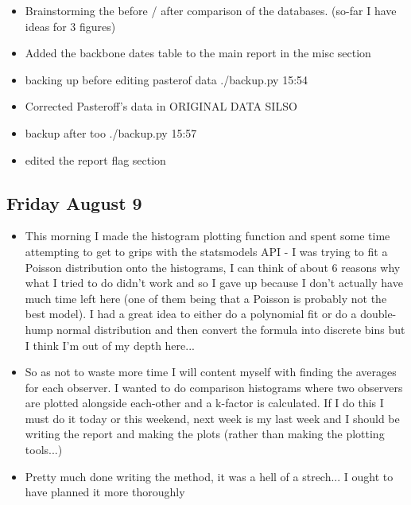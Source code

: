 \documentclass[12pt]{article}
\begin{document}
\begin{itemize}
    \item Brainstorming the before / after comparison of the databases. (so-far I have ideas for 3 figures)
    \item Added the backbone dates table to the main report in the misc section
    \item backing up before editing pasterof data ./backup.py 15:54
    \item Corrected Pasteroff's data in ORIGINAL DATA SILSO
    \item backup after too ./backup.py 15:57
    \item edited the report flag section
\end{itemize}

\subsection{Friday August 9}
\begin{itemize}
    \item This morning I made the histogram plotting function and spent some time attempting to get to grips with the statsmodels API - I was trying to fit a Poisson distribution onto the histograms, I can think of about 6 reasons why what I tried to do didn't work and so I gave up because I don't actually have much time left here (one of them being that a Poisson is probably not the best model). I had a great idea to either do a polynomial fit or do a double-hump normal distribution and then convert the formula into discrete bins but I think I'm out of my depth here...
    \item So as not to waste more time I will content myself with finding the averages for each observer. I wanted to do comparison histograms where two observers are plotted alongside each-other and a k-factor is calculated. If I do this I must do it today or this weekend, next week is my last week and I should be writing the report and making the plots (rather than making the plotting tools...)
    \item Pretty much done writing the method, it was a hell of a strech... I ought to have planned it more thoroughly
\end{itemize}
\end{document}
